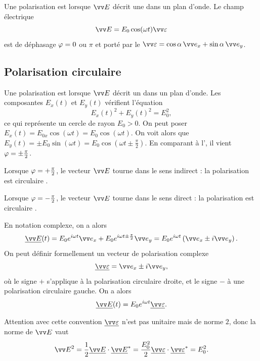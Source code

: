 \documentclass[12pt,fancy]{cours}
\begin{document}
 \begin{definition}\label{def:}
 Une polarisation est  lorsque $\E$ décrit une  dans un plan d'onde. Le champ électrique 
 $$
\E = E_0 \cos(\omega t) \Vec{\veps}
 $$
 est de déphasage $\varphi = 0$ ou $\pi$ et porté par le  $\Vec{\veps} = \cos\alpha \, \ex + \sin \alpha \, \ey$.
 \end{definition}
 
 \subsection{Polarisation circulaire}
 Une polarisation est  lorsque $\E$ décrit un  dans un plan d'onde.
 Les composantes $E_x(t)$ et $E_y(t)$ vérifient l'équation 
 \begin{equation}
  E_{x}(t)^2+E_{y}(t)^2=E_{0}^2,
\end{equation}
ce qui représente un cercle de rayon $E_0>0$. On peut poser $E_x(t) = E_{0x} \cos(\omega t ) = E_0 \cos(\omega t)$. On voit alors que $E_y(t) = \pm E_0 \sin(\omega t) = E_0 \cos(\omega t \pm \frac{\pi}{2})$. En comparant à l', il vient $\varphi = \pm \frac{\pi}{2}$.
\begin{liste}
  \item Lorsque $\varphi = + \frac{\pi}{2}$, le vecteur $\E$ tourne dans le sens indirect : la polarisation est circulaire .
  \item Lorsque $\varphi = - \frac{\pi}{2}$, le vecteur $\E$ tourne dans le sens direct : la polarisation est circulaire .
\end{liste}

En notation complexe, on a alors
\begin{equation}
  \udl{\E}(t) = E_0 e^{i\omega t} \ex + E_0 e^{i\omega t \pm \frac{\pi}{2}}\ey = E_0 e^{i\omega t}\left( \ex \pm i \ey \right).
\end{equation}
On peut définir formellement un vecteur de polarisation complexe
\begin{equation}
  \udl{\Vec{\veps}} = \ex \pm i \ey,
\end{equation}
où le signe $+$ s'applique à la polarisation circulaire droite, et le signe $-$ à une polarisation circulaire gauche. On a alors
\begin{equation}
  \udl{\E}(t) = E_0 e^{i\omega t} \udl{\Vec{\veps}}.
\end{equation}
\begin{remarque}
  Attention avec cette convention $\udl{\Vec{\veps}}$ n'est pas unitaire mais de norme $2$, donc la norme de $\E$ vaut
  \begin{equation}
    \E^2 = \frac{1}{2} \udl{\E} \ps \udl{\E}^* = \frac{E_0^2}{2} \udl{\Vec{\veps}} \ps \udl{\Vec{\veps}}^* = E_0^2.
  \end{equation}
\end{remarque}
\end{document}
